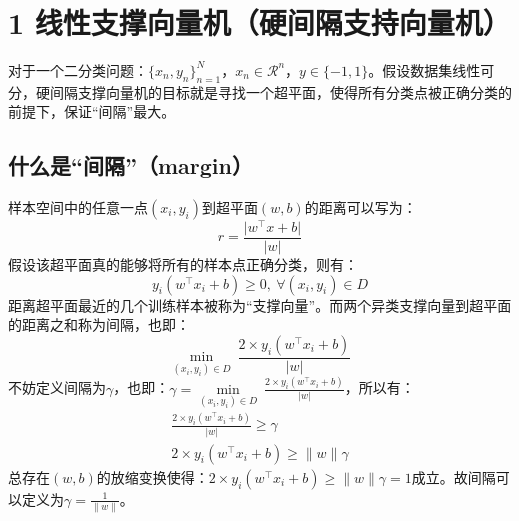 \documentclass[twoside]{article}
\begin{document}
\clearpage
{} \vspace{2mm} \\
\section*{1 线性支撑向量机（硬间隔支持向量机）}
对于一个二分类问题：$\{x_n,y_n\}_{n=1}^N$，$x_n \in \mathcal{R}^n$，$y \in \{-1,1\}$。假设数据集线性可分，硬间隔支撑向量机的目标就是寻找一个超平面，使得所有分类点被正确分类的前提下，保证“间隔”最大。
\subsection*{什么是“间隔”（margin）}
样本空间中的任意一点$(x_i,y_i)$到超平面$(w,b)$的距离可以写为：
\begin{equation*}
    r=\frac{\lvert w^\top x+b\rvert}{\lvert w \rvert}
\end{equation*}
假设该超平面真的能够将所有的样本点正确分类，则有：
\begin{equation*}
    y_i\left(w^\top x_i+b\right) \ge 0,\ \forall (x_i,y_i) \in D
\end{equation*}
距离超平面最近的几个训练样本被称为“支撑向量”。而两个异类支撑向量到超平面的距离之和称为间隔，也即：
\begin{equation*}
    \underset{(x_i,y_i)\in D}{\min}\ \frac{2\times y_i(w^\top x_i+b)}{\lvert w \rvert}
\end{equation*}
不妨定义间隔为$\gamma$，也即：$\gamma=\underset{(x_i,y_i)\in D}{\min}\ \frac{2\times y_i(w^\top x_i+b)}{\lvert w \rvert}$，所以有：
\begin{equation*}
    \begin{aligned}
        \frac{2 \times y_i(w^\top x_i+b)}{\lvert w \rvert}\ge \gamma\\
        2 \times y_i(w^\top x_i+b)\ge \lVert w \rVert \gamma
    \end{aligned}
\end{equation*}
总存在$(w,b)$的放缩变换使得：$2 \times y_i(w^\top x_i+b)\ge \lVert w \rVert \gamma=1$成立。故间隔可以定义为$\gamma=\frac{1}{\lVert w \rVert}$。
\end{document}
